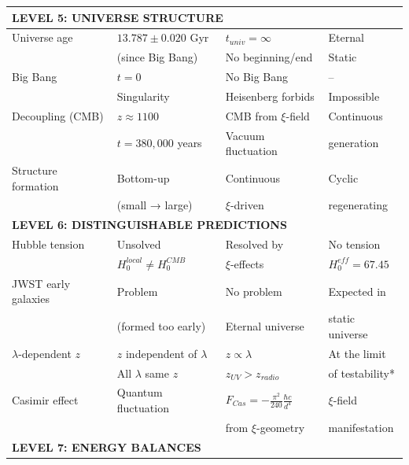 \begin{longtable}{p{4.0cm}p{3.2cm}p{2.8cm}p{2.8cm}}
	\midrule
	\multicolumn{4}{l}{\textbf{LEVEL 5: UNIVERSE STRUCTURE}} \\
	\midrule
	
	Universe age & $13.787 \pm 0.020$ Gyr & $t_{univ} = \infty$ & Eternal \\
	& (since Big Bang) & No beginning/end & Static \\[0.3em]
	
	Big Bang & $t = 0$ & No Big Bang & -- \\
	& Singularity & Heisenberg forbids & Impossible \\[0.3em]
	
	Decoupling (CMB) & $z \approx 1100$ & CMB from $\xi$-field & Continuous \\
	& $t = 380,000$ years & Vacuum fluctuation & generation \\[0.3em]
	
	Structure formation & Bottom-up & Continuous & Cyclic \\
	& (small → large) & $\xi$-driven & regenerating \\[0.3em]
	
	\midrule
	\multicolumn{4}{l}{\textbf{LEVEL 6: DISTINGUISHABLE PREDICTIONS}} \\
	\midrule
	
	Hubble tension & Unsolved & Resolved by & No tension \\
	& $H_0^{local} \neq H_0^{CMB}$ & $\xi$-effects & $H_0^{eff} = 67.45$ \\[0.3em]
	
	JWST early galaxies & Problem & No problem & Expected in \\
	& (formed too early) & Eternal universe & static universe \\[0.3em]
	
	$\lambda$-dependent $z$ & $z$ independent of $\lambda$ & $z \propto \lambda$ & At the limit \\
	& All $\lambda$ same $z$ & $z_{UV} > z_{radio}$ & of testability* \\[0.3em]
	
	Casimir effect & Quantum fluctuation & $F_{Cas} = -\frac{\pi^2}{240} \frac{\hbar c}{d^4}$ & $\xi$-field \\
	& & from $\xi$-geometry & manifestation \\[0.3em]
	
	\midrule
	\multicolumn{4}{l}{\textbf{LEVEL 7: ENERGY BALANCES}} \\
	\midrule
	

\end{longtable}
